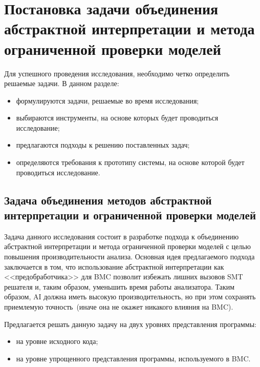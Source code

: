 \chapter{Постановка задачи объединения абстрактной интерпретации и метода ограниченной проверки моделей}
Для успешного проведения исследования, необходимо четко определить решаемые 
задачи. В данном разделе:
\begin{itemize}
\item формулируются задачи, решаемые во время исследования;
\item выбираются инструменты, на основе которых будет проводиться исследование;
\item предлагаются подходы к решению поставленных задач;
\item определяются требования к прототипу системы, на основе которой будет 
проводиться исследование.
\end{itemize}

\section{Задача объединения методов абстрактной интерпретации и ограниченной 
проверки моделей}
Задача данного исследования состоит в разработке подхода к объединению 
абстрактной интерпретации и метода ограниченной проверки моделей с целью 
повышения производительности анализа. Основная идея предлагаемого подхода 
заключается в том, что использование абстрактной интерпретации как 
<<предобработчика>> для BMC позволит избежать лишних вызовов SMT решателя и,
таким образом, уменьшить время работы анализатора. Таким образом, AI должна
иметь высокую производительность, но при этом сохранять приемлемую 
точность~(иначе она не окажет никакого влияния на BMC).

Предлагается решать данную задачу на двух уровнях представления программы:
\begin{itemize}
\item на уровне исходного кода;
\item на уровне упрощенного представления программы, используемого в BMC.
\end{itemize}

